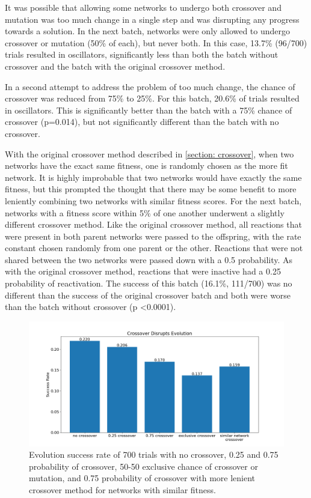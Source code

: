 \documentclass[12pt]{report}
\begin{document}
It was possible that allowing some networks to undergo both crossover and mutation was too much change in a single step and was disrupting any progress towards a solution. In the next batch, networks were only allowed to undergo crossover or mutation (50\% of each), but never both. In this case, 13.7\% (96/700) trials resulted in oscillators, significantly less than both the batch without crossover and the batch with the original crossover method.

In a second attempt to address the problem of too much change, the chance of crossover was reduced from 75\% to 25\%. For this batch, 20.6\% of trials resulted in oscillators. This is significantly better than the batch with a 75\% chance of crossover (p=0.014), but not significantly different than the batch with no crossover. 

With the original crossover method described in \ref{section: crossover}, when two networks have the exact same fitness, one is randomly chosen as the more fit network. It is highly improbable that two networks would have exactly the same fitness, but this prompted the thought that there may be some benefit to more leniently combining two networks with similar fitness scores. For the next batch, networks with a fitness score within 5\% of one another underwent a slightly different crossover method. Like the original crossover method, all reactions that were present in both parent networks were passed to the offspring, with the rate constant chosen randomly from one parent or the other. Reactions that were not shared between the two networks were passed down with a 0.5 probability. As with the original crossover method, reactions that were inactive had a 0.25 probability of reactivation. The success of this batch (16.1\%, 111/700) was no different than the success of the original crossover batch and both were worse than the batch without crossover (p \textless 0.0001).

\begin{figure}
	\centering
    \includegraphics[width=18cm]{images/crossover_success.png}
    \caption[Evolutionary success rate with different crossover strategies]{Evolution success rate of 700 trials with no crossover, 0.25 and 0.75 probability of crossover, 50-50 exclusive chance of crossover or mutation, and 0.75 probability of crossover with more lenient crossover method for networks with similar fitness.}
    \label{fig:crossover_success}
\end{figure}
\end{document}
